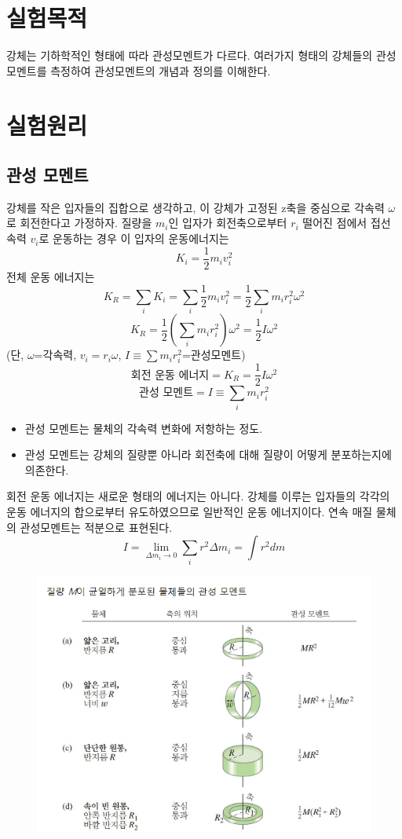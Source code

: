 \documentclass[12pt,a4paper]{article}
\begin{document}
\section{실험목적}
강체는 기하학적인 형태에 따라 관성모멘트가 다르다. 여러가지 형태의 강체들의
관성모멘트를 측정하여 관성모멘트의 개념과 정의를 이해한다.
\section{실험원리}
\subsection{관성 모멘트}
강체를 작은 입자들의 집합으로 생각하고, 이 강체가 고정된 z축을 중심으로 각속력
$\omega$로 회전한다고 가정하자. 질량을 $m_i$인 입자가 회전축으로부터 $r_i$ 떨어진
점에서 접선 속력 $v_i$로 운동하는 경우 이 입자의 운동에너지는
$$K_i=\frac{1}{2}m_iv_i^2$$
전체 운동 에너지는
$$K_R=\sum_iK_i=\sum_i\frac{1}{2}m_iv_i^2=\frac{1}{2}\sum_im_ir_i^2\omega^2$$
$$K_R=\frac{1}{2}\left(\sum_im_ir_i^2\right)\omega^2=\frac{1}{2}I\omega^2$$
(단, $\omega$=각속력, $v_i=r_i\omega$, $I\equiv\sum m_ir_i^2$=관성모멘트)
$$\textrm{회전 운동 에너지}=K_R=\frac{1}{2}I\omega^2$$
$$\textrm{관성 모멘트}=I\equiv\sum_im_ir_i^2$$
\clearpage
\begin{itemize}
    \item 관성 모멘트는 물체의 각속력 변화에 저항하는 정도.
    \item 관성 모멘트는 강체의 질량뿐 아니라 회전축에 대해 질량이 어떻게 분포하는지에
        의존한다.
\end{itemize}
회전 운동 에너지는 새로운 형태의 에너지는 아니다. 강체를 이루는 입자들의 각각의
운동 에너지의 합으로부터 유도하였으므로 일반적인 운동 에너지이다. 연속 매질 물체의
관성모멘트는 적분으로 표현된다.
$$I=\lim_{\Delta m_i \to 0}\sum_ir^2\Delta m_i=\int r^2dm$$
\begin{figure}[h!]
    \centering
    \includegraphics[width=15cm]{2024-05-26 224240.png}
\end{figure}
\end{document}
